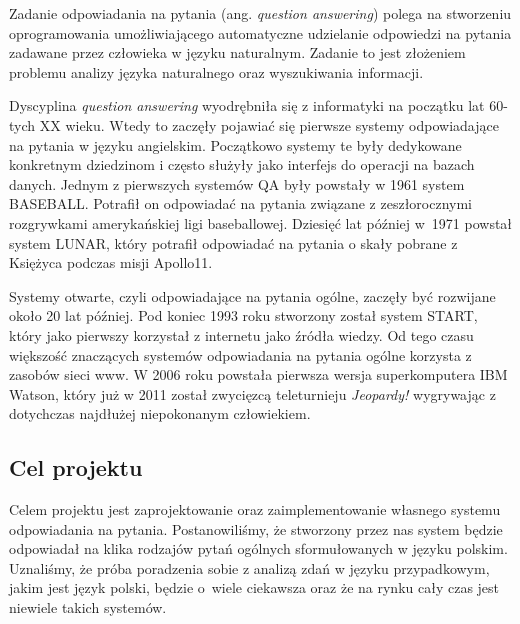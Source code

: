 
Zadanie odpowiadania na pytania (ang. \emph{question answering}) polega na stworzeniu oprogramowania umożliwiającego automatyczne udzielanie odpowiedzi na pytania zadawane przez człowieka w języku naturalnym. Zadanie to jest złożeniem problemu analizy języka naturalnego oraz wyszukiwania informacji.

Dyscyplina \emph{question answering} wyodrębniła się z informatyki na początku lat 60-tych XX wieku. Wtedy to zaczęły pojawiać się pierwsze systemy odpowiadające na pytania w języku angielskim. Początkowo systemy te były dedykowane konkretnym dziedzinom i często służyły jako interfejs do operacji na bazach danych. Jednym z pierwszych systemów QA były powstały w 1961 system BASEBALL. Potrafił on odpowiadać na pytania związane z zeszłorocznymi rozgrywkami amerykańskiej ligi baseballowej. Dziesięć lat później w~1971 powstał system LUNAR, który potrafił odpowiadać na pytania o skały pobrane z Księżyca podczas misji Apollo11. 

Systemy otwarte, czyli odpowiadające na pytania ogólne, zaczęły być rozwijane około 20 lat później. Pod koniec 1993 roku stworzony został system START, który jako pierwszy korzystał z internetu jako źródła wiedzy. Od tego czasu większość znaczących systemów odpowiadania na pytania ogólne korzysta z zasobów sieci www. W 2006 roku powstała pierwsza wersja superkomputera IBM Watson, który już w 2011 został zwycięzcą teleturnieju \emph{Jeopardy!} wygrywając z dotychczas najdłużej niepokonanym człowiekiem.

\subsection{Cel projektu}\label{subsec:wpr:cel}
Celem projektu jest zaprojektowanie oraz zaimplementowanie własnego systemu odpowiadania na pytania. Postanowiliśmy, że stworzony przez nas system będzie odpowiadał na klika rodzajów pytań ogólnych sformułowanych w języku polskim. Uznaliśmy, że próba poradzenia sobie z analizą zdań w języku przypadkowym, jakim jest język polski, będzie o~wiele ciekawsza oraz że na rynku cały czas jest niewiele takich systemów. 



